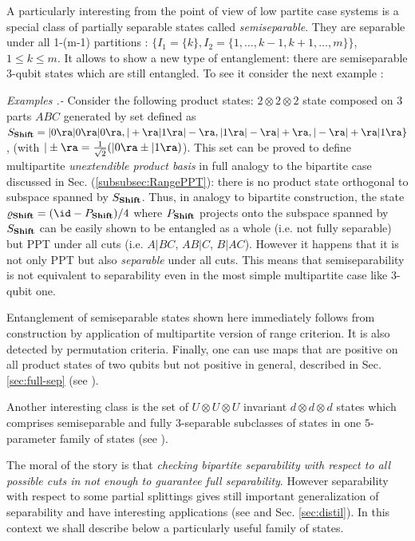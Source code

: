 \documentclass[rmp,12pt,preprint]{revtex4-2}
\begin{document}
A particularly interesting from the point of view of low partite
case systems is a special class of partially separable states called
{\it semiseparable}. They are separable under all 1-(m-1) partitions
: $\{ I_{1}=\{ k \}, I_{2}=\{ 1,\ldots,k-1,k+1,\ldots,m \} \}$, $1 \leq k
\leq m $. It allows to show a new type of entanglement: there are
semiseparable $3$-qubit states which are still entangled. To see it
consider the next example \cite{UPB2}:

{\it Examples .-} Consider the following product states: $2 \otimes 2
\otimes 2$ state composed on 3 parts $ABC$ generated by set defined as
$S_{\bf Shift}=|0\ra|0\ra|0\ra,|+\ra|1\ra|-\ra,|1\ra|-\ra|+\ra,
|-\ra|+\ra|1\ra \}$, (with $|\pm\ra=\frac{1}{\sqrt{2}}(|0\ra\pm
|1\ra)$). This set can be proved to define multipartite {\it
  unextendible product basis} in full analogy to the bipartite case
discussed in Sec. (\ref{subsubsec:RangePPT}): there is no product
state orthogonal to subspace spanned by $S_{\bf Shift}$. Thus, in
analogy to bipartite construction, the state $\varrho_{\bf
  Shift}=(\id-P_{\bf Shift})/4$ where $P_{\bf Shift}$ projects onto
the subspace spanned by $S_{\bf Shift}$ can be easily shown to be
entangled as a whole (i.e. not fully separable) but PPT under all cuts
(i.e. $A|BC$, $AB|C$, $B|AC$). However it happens that it is not only
PPT but also {\it separable} under all cuts. This means that
semiseparability is not equivalent to separability even in the most
simple multipartite case like $3$-qubit one.

Entanglement of semiseparable states shown here immediately follows
from construction by application of multipartite version of range
criterion. It is also detected by permutation criteria.  Finally, one
can use maps that are positive on all product states of two qubits but
not positive in general, described in Sec. \ref{sec:full-sep} (see
\cite{Ho00}).

Another interesting class is the set of $U \otimes U \otimes U$
invariant $d \otimes d \otimes d$ states which comprises semiseparable
and fully 3-separable subclasses of states in one $5$-parameter family
of states (see \cite{UUU}).

The moral of the story is that {\it checking bipartite separability
  with respect to all possible cuts in not enough to guarantee full
  separability}. However separability with respect to some partial
splittings gives still important generalization of separability and
have interesting applications (see
\cite{Smolin,DCpur,DurC_multi_dist2000,DurCirac_activation} and
Sec. \ref{sec:distil}). In this context we shall describe below a
particularly useful family of states.
\end{document}
